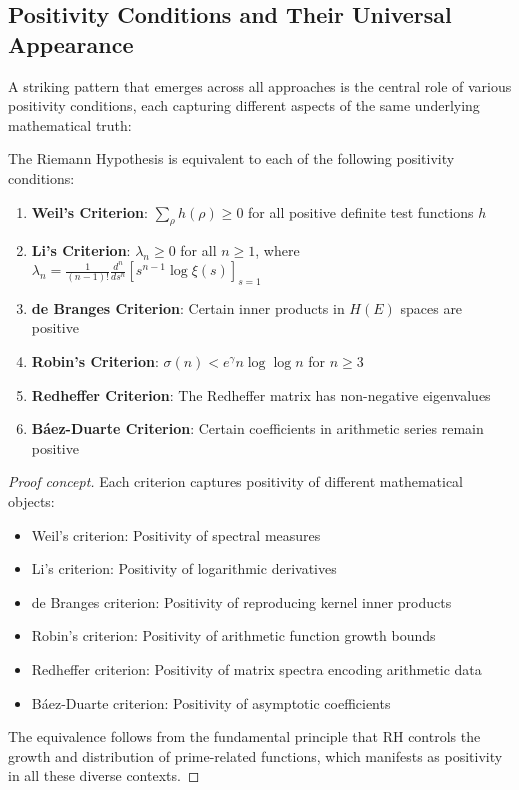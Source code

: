 \subsection{Positivity Conditions and Their Universal Appearance}
\label{subsec:positivity_universal}

A striking pattern that emerges across all approaches is the central role of various positivity conditions, each capturing different aspects of the same underlying mathematical truth:

\begin{theorem}
The Riemann Hypothesis is equivalent to each of the following positivity conditions:
\begin{enumerate}
\item \textbf{Weil's Criterion}: $\sum_{\rho} h(\rho) \geq 0$ for all positive definite test functions $h$
\item \textbf{Li's Criterion}: $\lambda_n \geq 0$ for all $n \geq 1$, where $\lambda_n = \frac{1}{(n-1)!}\frac{d^n}{ds^n}\left[s^{n-1}\log\xi(s)\right]_{s=1}$
\item \textbf{de Branges Criterion}: Certain inner products in $H(E)$ spaces are positive
\item \textbf{Robin's Criterion}: $\sigma(n) < e^\gamma n \log\log n$ for $n \geq 3$
\item \textbf{Redheffer Criterion}: The Redheffer matrix has non-negative eigenvalues
\item \textbf{Báez-Duarte Criterion}: Certain coefficients in arithmetic series remain positive
\end{enumerate}
\end{theorem}

\begin{proof}[Proof concept]
Each criterion captures positivity of different mathematical objects:
\begin{itemize}
\item Weil's criterion: Positivity of spectral measures
\item Li's criterion: Positivity of logarithmic derivatives
\item de Branges criterion: Positivity of reproducing kernel inner products
\item Robin's criterion: Positivity of arithmetic function growth bounds
\item Redheffer criterion: Positivity of matrix spectra encoding arithmetic data
\item Báez-Duarte criterion: Positivity of asymptotic coefficients
\end{itemize}
The equivalence follows from the fundamental principle that RH controls the growth and distribution of prime-related functions, which manifests as positivity in all these diverse contexts.
\end{proof}


